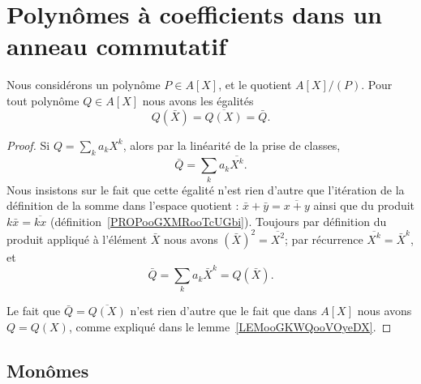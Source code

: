 \section{Polynômes à coefficients dans un anneau commutatif}
\label{SECooVMABooVdhbPo}

\begin{lemma}       \label{LEMooXFMAooMBgIrN}
    Nous considérons un polynôme \( P\in A[X]\), et le quotient \( A[X]/(P)\). Pour tout polynôme \( Q\in A[X]\) nous avons les égalités
    \begin{equation}
        Q(\bar X)=\overline{ Q(X) }=\bar Q.
    \end{equation}
\end{lemma}

\begin{proof}
    Si \( Q=\sum_ka_kX^k\), alors par la linéarité de la prise de classes,
    \begin{equation}        \label{EQooXQRMooIPGFVM}
        \bar Q=\sum_ka_k\overline{ X^k }.
    \end{equation}
    Nous insistons sur le fait que cette égalité n'est rien d'autre que l'itération de la définition de la somme dans l'espace quotient : \( \bar x+\bar y=\overline{ x+y }\) ainsi que du produit \( k\bar x=\overline{ kx }\) (définition~\ref{PROPooGXMRooTcUGbi}). Toujours par définition du produit appliqué à l'élément \( \bar X\) nous avons \( (\bar X)^2=\overline{ X^2 }\); par récurrence \( \overline{ X^k }=\bar X^k\), et
    \begin{equation}
        \bar Q=\sum_ka_k\bar X^k=Q(\bar X).
    \end{equation}

    Le fait que \( \bar Q=\overline{ Q(X) }\) n'est rien d'autre que le fait que dans \( A[X]\) nous avons \( Q=Q(X)\), comme expliqué dans le lemme~\ref{LEMooGKWQooVOyeDX}.
\end{proof}

\subsection{Monômes}

